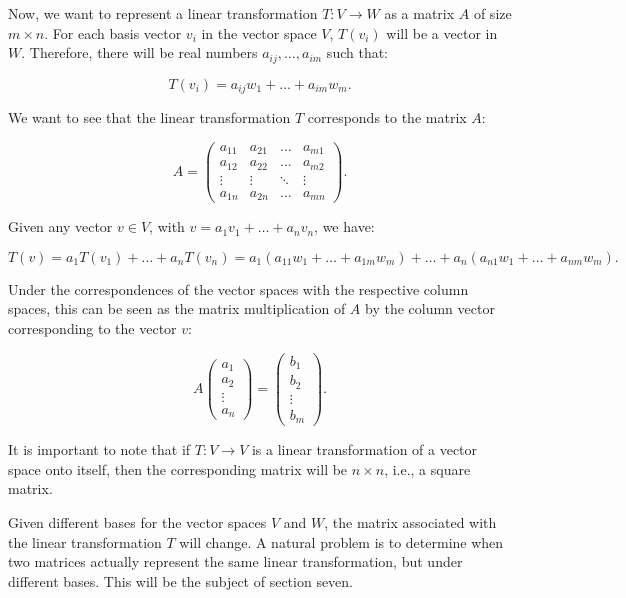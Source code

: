 \documentclass[
]{book}
\theoremstyle{definition}
\theoremstyle{definition}
\theoremstyle{definition}
\theoremstyle{definition}
\theoremstyle{remark}
\begin{document}
Now, we want to represent a linear transformation \(T: V \to W\) as a matrix \(A\) of size \(m \times n\). For each basis vector \(v_i\) in the vector space \(V\), \(T(v_i)\) will be a vector in \(W\). Therefore, there will be real numbers \(a_{ij}, \dots, a_{im}\) such that:

\[
T(v_i) = a_{ij}w_1 + \dots + a_{im}w_m.
\]

We want to see that the linear transformation \(T\) corresponds to the matrix \(A\):

\[
A = \begin{pmatrix} a_{11} & a_{21} & \dots & a_{m1} \\ a_{12} & a_{22} & \dots & a_{m2} \\ \vdots & \vdots & \ddots & \vdots \\ a_{1n} & a_{2n} & \dots & a_{mn} \end{pmatrix}.
\]

Given any vector \(v \in V\), with \(v = a_1v_1 + \dots + a_nv_n\), we have:

\[
T(v) = a_1T(v_1) + \dots + a_nT(v_n) = a_1(a_{11}w_1 + \dots + a_{1m}w_m) + \dots + a_n(a_{n1}w_1 + \dots + a_{nm}w_m).
\]

Under the correspondences of the vector spaces with the respective column spaces, this can be seen as the matrix multiplication of \(A\) by the column vector corresponding to the vector \(v\):

\[
A \begin{pmatrix} a_1 \\ a_2 \\ \vdots \\ a_n \end{pmatrix} = \begin{pmatrix} b_1 \\ b_2 \\ \vdots \\ b_m \end{pmatrix}.
\]

It is important to note that if \(T: V \to V\) is a linear transformation of a vector space onto itself, then the corresponding matrix will be \(n \times n\), i.e., a square matrix.

Given different bases for the vector spaces \(V\) and \(W\), the matrix associated with the linear transformation \(T\) will change. A natural problem is to determine when two matrices actually represent the same linear transformation, but under different bases. This will be the subject of section seven.

  
\end{document}
